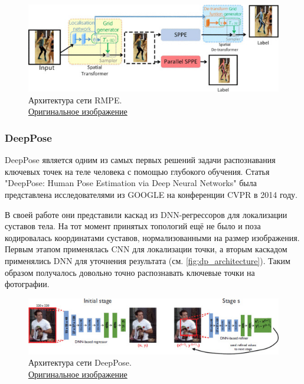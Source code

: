 \begin{figure}[h]
	\centering
	\includegraphics[width=\textwidth]{./images/AlphaPose_architecture}
	\caption{Архитектура сети RMPE.\\ \href{https://ieeexplore.ieee.org/mediastore_new/IEEE/content/media/8234942/8237262/8237518/8237518-fig-4-source-small.gif}{Оригинальное изображение}}
	\label{fig:ap_architecture}
\end{figure}




\subsubsection{DeepPose}

DeepPose является одним из самых первых решений задачи распознавания ключевых точек на теле человека с помощью глубокого обучения. Статья "DeepPose: Human Pose Estimation via Deep Neural Networks"{} \cite{DeepPose} была представлена исследователями из GOOGLE на конференции CVPR в 2014 году.

В своей работе они представили каскад из DNN-регрессоров для локализации суставов тела. На тот момент принятых топологий ещё не было и поза кодировалась координатами суставов, нормализованными на размер изображения.
Первым этапом применялась CNN для локализации точки, а вторым каскадом применялись DNN для уточнения результата (см. \autoref{fig:dp_architecture}). Таким образом получалось довольно точно распознавать ключевые точки на фотографии.

\begin{figure}[h]
	\centering
	\includegraphics[width=\textwidth]{./images/DeepPose}
	\caption{Архитектура сети DeepPose.\\ \href{https://ieeexplore.ieee.org/mediastore_new/IEEE/content/media/6909096/6909393/6909610/6909610-fig-2-source-small.gif}{Оригинальное изображение}}
	\label{fig:dp_architecture}
\end{figure}





